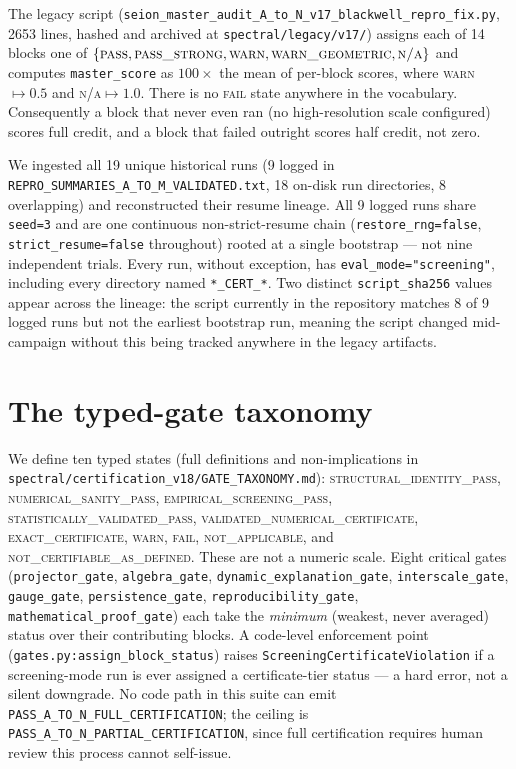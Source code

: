 \documentclass[11pt]{amsart}
\begin{document}
The legacy script (\texttt{seion\_master\_audit\_A\_to\_N\_v17\_blackwell\_repro\_fix.py},
2653 lines, hashed and archived at
\texttt{spectral/legacy/v17/}) assigns each of 14 blocks one of
$\{\textsc{pass}, \textsc{pass\_strong}, \textsc{warn}, \textsc{warn\_geometric}, \textsc{n/a}\}$
and computes \texttt{master\_score} as $100\times$ the mean of per-block
scores, where \textsc{warn}$\mapsto 0.5$ and \textsc{n/a}$\mapsto 1.0$.
There is no \textsc{fail} state anywhere in the vocabulary. Consequently a
block that never even ran (no high-resolution scale configured) scores
full credit, and a block that failed outright scores half credit, not
zero.

We ingested all 19 unique historical runs (9 logged in
\texttt{REPRO\_SUMMARIES\_A\_TO\_M\_VALIDATED.txt}, 18 on-disk run
directories, 8 overlapping) and reconstructed their resume lineage. All 9
logged runs share \texttt{seed=3} and are one continuous non-strict-resume
chain (\texttt{restore\_rng=false}, \texttt{strict\_resume=false}
throughout) rooted at a single bootstrap --- not nine independent trials.
Every run, without exception, has \texttt{eval\_mode="screening"},
including every directory named \texttt{*\_CERT\_*}. Two distinct
\texttt{script\_sha256} values appear across the lineage: the script
currently in the repository matches 8 of 9 logged runs but not the
earliest bootstrap run, meaning the script changed mid-campaign without
this being tracked anywhere in the legacy artifacts.

\section{The typed-gate taxonomy}
\label{sec:taxonomy}

We define ten typed states (full definitions and non-implications in
\texttt{spectral/certification\_v18/GATE\_TAXONOMY.md}):
\textsc{structural\_identity\_pass}, \textsc{numerical\_sanity\_pass},
\textsc{empirical\_screening\_pass}, \textsc{statistically\_validated\_pass},
\textsc{validated\_numerical\_certificate}, \textsc{exact\_certificate},
\textsc{warn}, \textsc{fail}, \textsc{not\_applicable}, and
\textsc{not\_certifiable\_as\_defined}. These are not a numeric scale.
Eight critical gates (\texttt{projector\_gate}, \texttt{algebra\_gate},
\texttt{dynamic\_explanation\_gate}, \texttt{interscale\_gate},
\texttt{gauge\_gate}, \texttt{persistence\_gate},
\texttt{reproducibility\_gate}, \texttt{mathematical\_proof\_gate}) each
take the \emph{minimum} (weakest, never averaged) status over their
contributing blocks. A code-level enforcement point
(\texttt{gates.py:assign\_block\_status}) raises
\texttt{ScreeningCertificateViolation} if a screening-mode run is ever
assigned a certificate-tier status --- a hard error, not a silent
downgrade. No code path in this suite can emit
\texttt{PASS\_A\_TO\_N\_FULL\_CERTIFICATION}; the ceiling is
\texttt{PASS\_A\_TO\_N\_PARTIAL\_CERTIFICATION}, since full certification
requires human review this process cannot self-issue.
\end{document}
